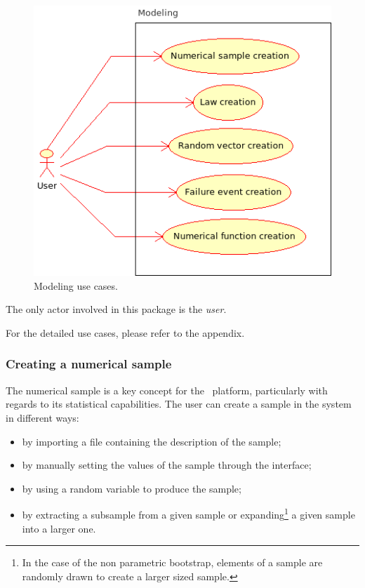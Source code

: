 \begin{figure}[htb]
  \begin{center}
    \includegraphics[scale=0.9]{Figures/analysis/modeling.png}
    \caption{Modeling use cases.}\label{fig:modeling}
  \end{center}
\end{figure}

The only actor involved in this package is the \emph{user}.

For the detailed use cases, please refer to the appendix.

\subsubsection{Creating a numerical sample}

The numerical sample is a key concept for the \OT\ platform, particularly with regards to its statistical capabilities. The user can create a sample in the system in different ways:
\begin{itemize}
\item by importing a file containing the description of the sample;
\item by manually setting the values of the sample through the interface;
\item by using a random variable to produce the sample;
\item by extracting a subsample from a given sample or expanding\footnote{In the case of the non parametric bootstrap, elements of a sample are randomly drawn to create a larger sized sample.} a given sample into a larger one.
\end{itemize}

